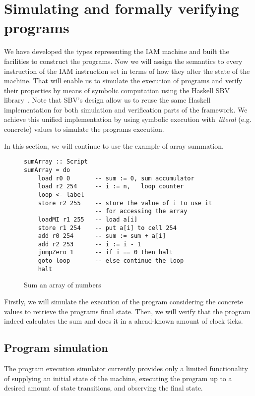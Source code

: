 \section{Simulating and formally verifying programs}

We have developed the types representing the IAM machine and built the facilities
to construct the programs. Now we will assign the semantics to every instruction
of the IAM instruction set in terms of how they alter the state of the machine.
That will enable us to simulate the execution of programs and verify their properties
by means of symbolic computation using the Haskell SBV library~\cite{SBV}.
Note that SBV's design allow us to reuse the same Haskell implementation for
both simulation and verification parts of the framework. We achieve this unified
implementation by using symbolic execution with~\emph{literal} (e.g. concrete) values
to simulate the programs execution.

In this section, we will continue to use the example of array summation.

\begin{figure}[H]
\begin{verbatim}
sumArray :: Script
sumArray = do
    load r0 0       -- sum := 0, sum accumulator
    load r2 254     -- i := n,   loop counter
    loop <- label
    store r2 255    -- store the value of i to use it
                    -- for accessing the array
    loadMI r1 255   -- load a[i]
    store r1 254    -- put a[i] to cell 254
    add r0 254      -- sum := sum + a[i]
    add r2 253      -- i := i - 1
    jumpZero 1      -- if i == 0 then halt
    goto loop       -- else continue the loop
    halt
\end{verbatim}
\caption{Sum an array of numbers}
\label{arraySum}
\end{figure}

Firstly, we will simulate the execution of the program considering the concrete
values to retrieve the programs final state. Then, we will verify that the program
indeed calculates the sum and does it in a ahead-known amount of clock ticks.

\subsection{Program simulation}

The program execution simulator currently provides only a limited functionality
of supplying an initial state of the machine, executing the program up to a
desired amount of state transitions, and observing the final state.

